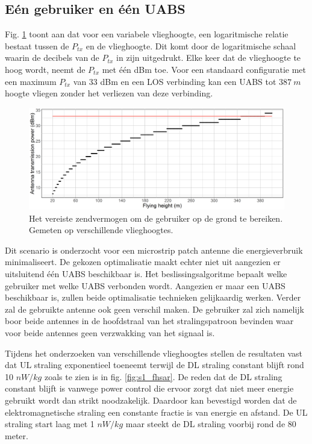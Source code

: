 \documentclass[twocolumn]{phdsymp_dutch}
\begin{document}
\subsection{E\'en gebruiker en \'e\'en \gls{UABS}}
Fig. \ref{fig:ptx} toont aan dat voor een variabele vlieghoogte, een logaritmische relatie bestaat tussen de 
 $P_{tx}$ en de vlieghoogte.
 Dit komt door de logaritmische schaal waarin de decibels van de $P_{tx}$ in zijn uitgedrukt.
Elke keer dat de vlieghoogte te hoog wordt, neemt de $P_{tx}$ met \'e\'en dBm toe.
Voor een standaard configuratie met een maximum $P_{tx}$ van 33 dBm en een \gls{LOS} verbinding kan een 
\gls{UABS} tot $387\ m$ hoogte vliegen zonder het verliezen van deze verbinding.

\begin{figure}[h!]
\centering
  \includegraphics[width=\linewidth]{s1/ptx.png}
  \caption{Het vereiste zendvermogen om de gebruiker op de grond te bereiken. Gemeten op verschillende vlieghoogtes.}
  \label{fig:ptx}
\end{figure}

Dit scenario is onderzocht voor een microstrip patch antenne die energieverbruik minimaliseert.
De gekozen optimalisatie maakt echter niet uit aangezien er uitsluitend \'e\'en \gls{UABS} beschikbaar is.
Het beslissingsalgoritme bepaalt welke gebruiker met welke \gls{UABS} verbonden wordt.
Aangezien er maar een \gls{UABS} beschikbaar is, zullen beide optimalisatie technieken gelijkaardig werken.
Verder zal de gebruikte antenne ook geen verschil maken. 
De gebruiker zal zich namelijk boor beide antennes in de hoofdstraal van het stralingspatroon 
bevinden waar voor beide antennes geen verzwakking van het signaal is.

Tijdens het onderzoeken van verschillende vlieghoogtes stellen de resultaten vast  dat
\gls{UL} straling exponentieel toeneemt terwijl de \gls{DL} straling constant blijft rond 
10 $nW/kg$ zoals te zien is in fig. \ref{fig:s1_fhsar}. De reden dat de \gls{DL} straling constant blijft is vanwege power control die ervoor zorgt
dat niet meer energie gebruikt wordt dan strikt noodzakelijk. 
Daardoor kan bevestigd worden dat de elektromagnetische straling een constante fractie is van energie en afstand.
De \gls{UL} straling start laag met 1 $nW/kg$ maar steekt de \gls{DL} straling voorbij rond de 80 meter.
\end{document}
